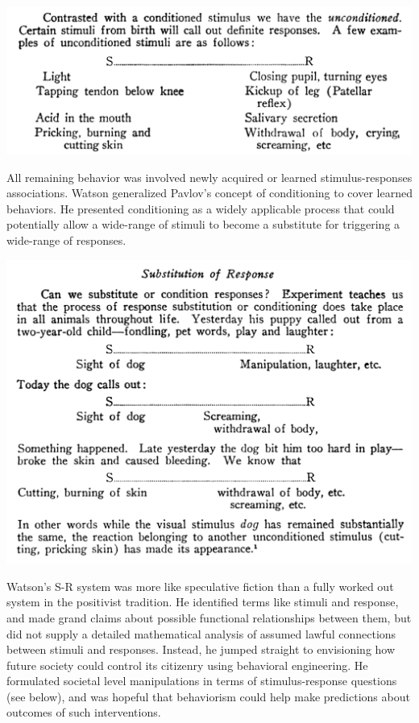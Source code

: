 \documentclass[
  oneside,
  12pt]{crumpbook}
\begin{document}
\begin{center}\includegraphics[width=1\linewidth]{imgs/Watson_unconditioned} \end{center}

All remaining behavior was involved newly acquired or learned stimulus-responses associations. Watson generalized Pavlov's concept of conditioning to cover learned behaviors. He presented conditioning as a widely applicable process that could potentially allow a wide-range of stimuli to become a substitute for triggering a wide-range of responses.

\begin{center}\includegraphics[width=1\linewidth]{imgs/Watson_conditioned} \end{center}

Watson's S-R system was more like speculative fiction than a fully worked out system in the positivist tradition. He identified terms like stimuli and response, and made grand claims about possible functional relationships between them, but did not supply a detailed mathematical analysis of assumed lawful connections between stimuli and responses. Instead, he jumped straight to envisioning how future society could control its citizenry using behavioral engineering. He formulated societal level manipulations in terms of stimulus-response questions (see below), and was hopeful that behaviorism could help make predictions about outcomes of such interventions.
\end{document}
